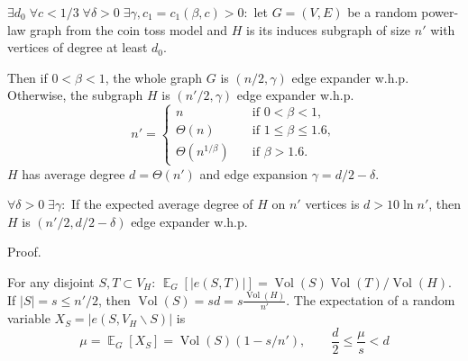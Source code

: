 \documentclass{beamer}
\newcommand{\E}{\mathop{{}\mathbb{E}}}
\DeclareMathOperator*{\Vol}{Vol}
\newcommand{\autotitle}{\secname\ifdefempty{\subsecname}{}{~--- \subsecname}}
\newcommand{\smalldisplayskips}{
    \setlength{\abovedisplayskip}{3pt}
    \setlength{\belowdisplayskip}{3pt}}
\begin{document}
\begin{frame}{\autotitle}
    \small
    \begin{theorem}
        $\exists d_0\;\forall c<1/3\;\forall\delta>0\;\exists\gamma,c_1=c_1(\beta,c)>0:$
        let $G=(V,E)$ be a random power-law graph from the coin toss model and $H$
        is its induces subgraph of size $n'$ with vertices of degree at least $d_0$.
        
        Then if $0<\beta<1$, the whole graph $G$ is $(n/2,\gamma)$ edge expander w.h.p.
        Otherwise, the subgraph $H$ is $(n'/2,\gamma)$ edge expander w.h.p.
        \begin{equation*}
            n'=
            \begin{cases}
                n & \quad \text{if } 0<\beta<1,\\
                \Theta(n) & \quad \text{if } 1\leq\beta\leq 1.6,\\
                \Theta\left(n^{1/\beta}\right) & \quad \text{if } \beta>1.6.
            \end{cases}
        \end{equation*}
        $H$ has average degree $d=\Theta(n')$ and edge expansion $\gamma=d/2-\delta$.
    \end{theorem}
\end{frame}

\begin{frame}{\autotitle}
    \begin{lemma}
        $\forall\delta>0\;\exists\gamma:$
        If the expected average degree of $H$ on $n'$ vertices is $d>10\ln n'$,
        then $H$ is $(n'/2,d/2-\delta)$ edge expander w.h.p.
    \end{lemma}
    \begin{block}{Proof.}
        \smalldisplayskips
        For any disjoint $S,T\subset V_H$:
        $\E_G[|e(S,T)|]=\Vol(S)\Vol(T)/\Vol(H)$.
        If $|S|=s\leq n'/2$, then $\Vol(S)=sd=s\frac{\Vol(H)}{n'}$.
        The expectation of a random variable $X_S=|e(S,V_H\backslash S)|$ is
        \begin{equation*}
            \mu=\E_G[X_S]=\Vol(S)(1-s/n'),
            \qquad\frac{d}{2}\leq\frac{\mu}{s}<d
        \end{equation*}
    \end{block}
\end{frame}
\end{document}

